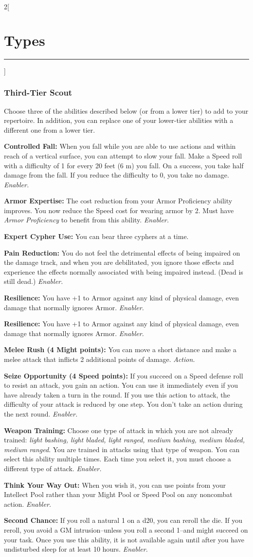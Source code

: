 \documentclass[a4paper,10pt,final]{book}
\newcommand{\HRule}{\rule{\linewidth}{0.5mm}} %
\newcommand{\newSection}[1]{\section*{#1} \addcontentsline{toc}{section}{#1} \label{sec:#1} \HRule}
\newcommand{\itemAbility}[2]{\textcolor{25gray}{\textbullet\textbf{ #1:}} {#2}\par}
\newcommand{\enabler}{\textit{ Enabler.}}
\newcommand{\action}{\textit{ Action.}}
\newenvironment{docsection}[1]
{
  \begin{multicols*}{2}[\newSection{#1}]
}
{
  \end{multicols*}
  \newpage
}
\begin{document}
\begin{docsection}{Types}
\subsubsection*{Third-Tier Scout}
\label{subsub:scoutThirdTier}
Choose three of the abilities described
below (or from a lower tier) to add to your
repertoire. In addition, you can replace one
of your lower-tier abilities with a different
one from a lower tier.\par
\itemAbility{Controlled Fall}{When you fall while you
are able to use actions and within reach of
a vertical surface, you can attempt to slow
your fall. Make a Speed roll with a difficulty
of 1 for every 20 feet (6 m) you fall. On a
success, you take half damage from the fall.
If you reduce the difficulty to 0, you take no
damage.\enabler}
\itemAbility{Armor Expertise}{The cost
reduction from your Armor Proficiency
ability improves. You now reduce the Speed
cost for wearing armor by 2. Must have \textit{Armor Proficiency} to benefit from this ability.\enabler}
\itemAbility{Expert Cypher Use}{You can bear three
cyphers at a time.}
\itemAbility{Pain Reduction}{You do not feel the
detrimental effects of being impaired on the
damage track, and when you are debilitated,
you ignore those effects and experience
the effects normally associated with being
impaired instead. (Dead is still dead.)\enabler}
\itemAbility{Resilience}{You have +1 to Armor against
any kind of physical damage, even damage
that normally ignores Armor.\enabler}
\itemAbility{Resilience}{You have +1 to Armor against
any kind of physical damage, even damage
that normally ignores Armor.\enabler}
\itemAbility{Melee Rush (4 Might points)}{You can
move a short distance and make a melee
attack that inflicts 2 additional points of
damage.\action}
\itemAbility{Seize Opportunity (4 Speed points)}{If
you succeed on a Speed defense roll to
resist an attack, you gain an action. You can
use it immediately even if you have already
taken a turn in the round. If you use this
action to attack, the difficulty of your attack
is reduced by one step. You don’t take an
action during the next round. \enabler}
\itemAbility{Weapon Training}{Choose one type of
attack in which you are not already trained:
\textit{light bashing, light bladed, light ranged,
medium bashing, medium bladed, medium
ranged}. You are trained in attacks
using that type of weapon. You can select
this ability multiple times. Each time you
select it, you must choose a different type of
attack.\enabler}
\itemAbility{Think Your Way Out}{When you wish it,
you can use points from your Intellect Pool
rather than your Might Pool or Speed Pool
on any noncombat action.\enabler}
\itemAbility{Second Chance}{If you roll a natural 1
on a d20, you can reroll the die. If you reroll,
you avoid a GM intrusion--unless you roll a
second 1--and might succeed on your task.
Once you use this ability, it is not available
again until after you have undisturbed sleep for at least 10 hours.\enabler}







\end{docsection}
\end{document}

